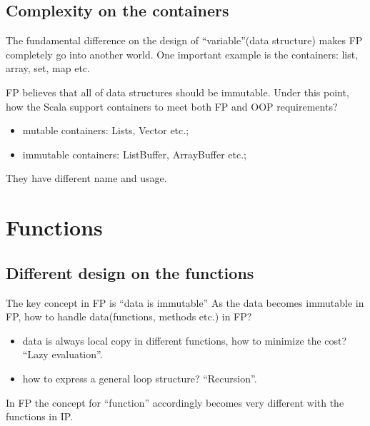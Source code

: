 \documentclass[notheorems, aspectratio=54]{beamer}
\begin{document}
\subsection{Complexity on the containers}
\begin{frame}

The fundamental difference on the design of ``variable''(data structure) makes FP completely go into another world.
One important example is the containers: list, array, set, map etc.

FP believes that all of data structures should be immutable. Under this point, how the Scala support containers to meet 
both FP and OOP requirements?
\begin{itemize}
 \item mutable containers: Lists, Vector etc.;
 \item immutable containers: ListBuffer, ArrayBuffer etc.;
\end{itemize}
They have different name and usage.

\end{frame}

\section{Functions}
\subsection{Different design on the functions}
\begin{frame}

\begin{alertblock}{The key concept in FP is ``data is immutable''}
 As the data becomes immutable in FP, how to handle data(functions, methods etc.) in FP? 
 \begin{itemize}
  \item data is always local copy in different functions, how to minimize the cost? ``Lazy evaluation''.
  \item how to express a general loop structure? ``Recursion''.
 \end{itemize}
\end{alertblock}
In FP the concept for ``function'' accordingly becomes very different with the functions in IP.

\end{frame}
\end{document}
